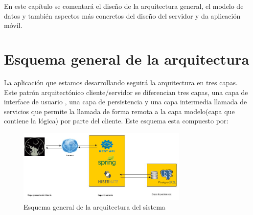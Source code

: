 

En este capítulo se comentará el diseño de la arquitectura general, el
modelo de datos y también aspectos más concretos del diseño del servidor y da aplicación
móvil.



\section{Esquema general de la arquitectura}
La aplicación que estamos desarrollando seguirá la arquitectura
en tres capas. Este patrón arquitectónico cliente/servidor se diferencian tres
capas, una capa de interface de usuario , una capa de persistencia
y una capa intermedia llamada de servicios que permite la llamada de forma remota a la capa modelo(capa que contiene la lógica) por parte del cliente. Este esquema esta compuesto por:




\begin{figure}[H]
		\centering
		\includegraphics[width=0.75\textwidth] {arquitectura2.png}
		\caption{Esquema general de la arquitectura del sistema }
	\end{figure}


